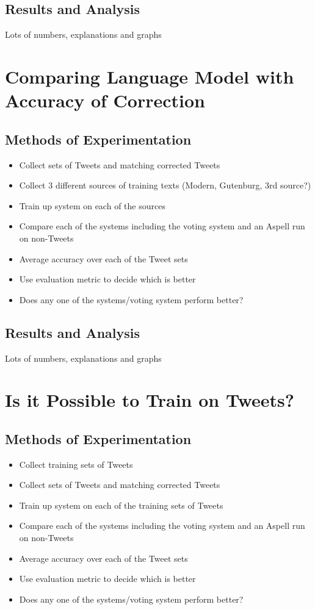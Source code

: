 \subsection{Results and Analysis}
Lots of numbers, explanations and graphs

\section{Comparing Language Model with Accuracy of Correction}
\subsection{Methods of Experimentation}
\begin{itemize}
	\item Collect sets of Tweets and matching corrected Tweets
	\item Collect 3 different sources of training texts (Modern, Gutenburg, 3rd source?)
	\item Train up system on each of the sources
	\item Compare each of the systems including the voting system and an Aspell run on non-Tweets
	\item Average accuracy over each of the Tweet sets
	\item Use evaluation metric to decide which is better
	\item Does any one of the systems/voting system perform better?
\end{itemize}

\subsection{Results and Analysis}
Lots of numbers, explanations and graphs

\section{Is it Possible to Train on Tweets?}
\subsection{Methods of Experimentation}
\begin{itemize}
	\item Collect training sets of Tweets
	\item Collect sets of Tweets and matching corrected Tweets
	\item Train up system on each of the training sets of Tweets
	\item Compare each of the systems including the voting system and an Aspell run on non-Tweets
	\item Average accuracy over each of the Tweet sets
	\item Use evaluation metric to decide which is better
	\item Does any one of the systems/voting system perform better?
\end{itemize}

